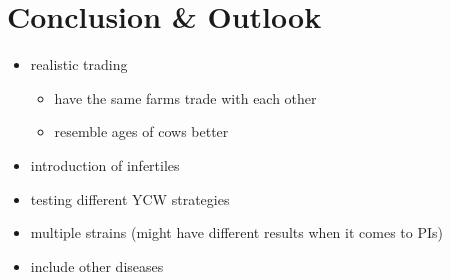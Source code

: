 \chapter{Conclusion \& Outlook}
\begin{itemize}
\item realistic trading
\begin{itemize}
\item have the same farms trade with each other
\item resemble ages of cows better
\end{itemize}
\item introduction of infertiles
\item testing different YCW strategies
\item multiple strains (might have different results when it comes to PIs)
\item include other diseases 
\end{itemize}


